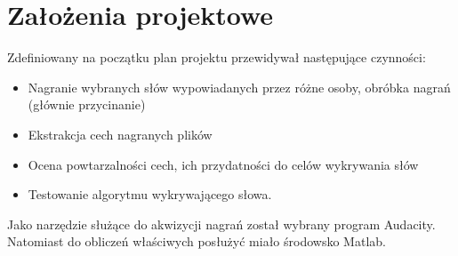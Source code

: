 \section{Założenia projektowe}

Zdefiniowany na początku plan projektu przewidywał następujące czynności:


\begin{itemize}
	\item Nagranie wybranych słów wypowiadanych przez różne osoby, obróbka nagrań (głównie przycinanie)
	\item Ekstrakcja cech nagranych plików
	\item Ocena powtarzalności cech, ich przydatności do celów wykrywania słów
	\item Testowanie algorytmu wykrywającego słowa.
\end{itemize}
	

Jako narzędzie służące do akwizycji nagrań został wybrany program Audacity. Natomiast do obliczeń właściwych posłużyć miało środowsko Matlab.
